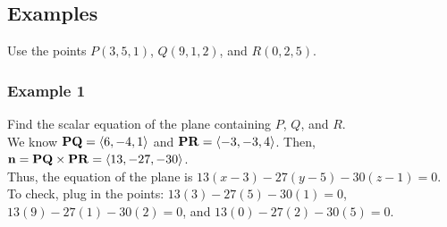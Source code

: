 \subsection{Examples}

Use the points \(P(3,5,1)\), \(Q(9,1,2)\), and \(R(0,2,5)\).

\subsubsection{Example 1}

Find the scalar equation of the plane containing \(P\), \(Q\), and \(R\). \\

We know \(\mathbf{PQ} = \left\langle 6,-4,1 \right\rangle\) and \(\mathbf{PR} = \left\langle -3,-3,4 \right\rangle\). Then, \(\mathbf{n} = \mathbf{PQ} \times \mathbf{PR} = \left\langle 13,-27,-30 \right\rangle\). \\

Thus, the equation of the plane is \(13(x - 3) - 27(y - 5) - 30(z - 1) = 0\). \\

To check, plug in the points: \(13(3) - 27(5) - 30(1) = 0\), \(13(9) - 27(1) - 30(2) = 0\), and \(13(0) - 27(2) - 30(5) = 0\).